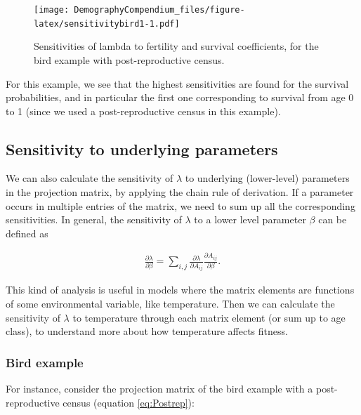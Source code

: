 \documentclass[
]{book}
\begin{document}
\begin{figure}
\centering
\texttt{[image: DemographyCompendium\_files/figure-latex/sensitivitybird1-1.pdf]}
\caption{\label{fig:sensitivitybird1}Sensitivities of lambda to fertility and survival coefficients, for the bird example with post-reproductive census.}
\end{figure}

For this example, we see that the highest sensitivities are found for the survival probabilities, and in particular the first one corresponding to survival from age 0 to 1 (since we used a post-reproductive census in this example).

\hypertarget{sensitivity-to-underlying-parameters}{%
\subsection{Sensitivity to underlying parameters}\label{sensitivity-to-underlying-parameters}}

We can also calculate the sensitivity of \(\lambda\) to underlying (lower-level) parameters in the projection matrix, by applying the chain rule of derivation. If a parameter occurs in multiple entries of the matrix, we need to sum up all the corresponding sensitivities. In general, the sensitivity of \(\lambda\) to a lower level parameter \(\beta\) can be defined as

\begin{align}
\frac{\partial \lambda}{\partial \beta}=\sum_{i,j} \frac{\partial \lambda}{\partial A_{ij}} \frac{\partial A_{ij}}{\partial \beta}.
\end{align}

This kind of analysis is useful in models where the matrix elements are functions of some environmental variable, like temperature. Then we can calculate the sensitivity of \(\lambda\) to temperature through each matrix element (or sum up to age class), to understand more about how temperature affects fitness.

\hypertarget{bird-example-12}{%
\subsubsection*{Bird example}\label{bird-example-12}}

For instance, consider the projection matrix of the bird example with a post-reproductive census (equation \eqref{eq:Postrep}):
\end{document}
